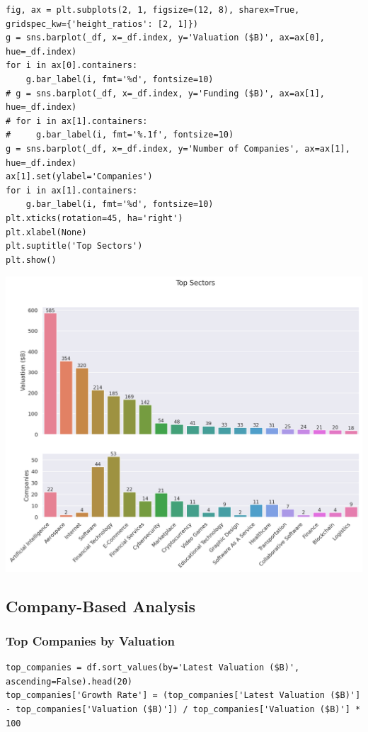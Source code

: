 \documentclass[a4paper,12pt]{article}
\begin{document}
\begin{verbatim}
fig, ax = plt.subplots(2, 1, figsize=(12, 8), sharex=True, gridspec_kw={'height_ratios': [2, 1]})
g = sns.barplot(_df, x=_df.index, y='Valuation ($B)', ax=ax[0], hue=_df.index)
for i in ax[0].containers:
    g.bar_label(i, fmt='%d', fontsize=10)
# g = sns.barplot(_df, x=_df.index, y='Funding ($B)', ax=ax[1], hue=_df.index)
# for i in ax[1].containers:
#     g.bar_label(i, fmt='%.1f', fontsize=10)
g = sns.barplot(_df, x=_df.index, y='Number of Companies', ax=ax[1], hue=_df.index)
ax[1].set(ylabel='Companies')
for i in ax[1].containers:
    g.bar_label(i, fmt='%d', fontsize=10)
plt.xticks(rotation=45, ha='right')
plt.xlabel(None)
plt.suptitle('Top Sectors')
plt.show()
\end{verbatim}

\begin{center}
\includegraphics[width=.9\linewidth]{./.ob-jupyter/8c900de15d8f038ec9cee86aad5d7978e4f44f15.png}
\label{}
\end{center}
\subsection{Company-Based Analysis}
\label{sec:org978037f}
\subsubsection{Top Companies by Valuation}
\label{sec:org863c876}

\begin{verbatim}
top_companies = df.sort_values(by='Latest Valuation ($B)', ascending=False).head(20)
top_companies['Growth Rate'] = (top_companies['Latest Valuation ($B)'] - top_companies['Valuation ($B)']) / top_companies['Valuation ($B)'] * 100
\end{verbatim}
\end{document}

